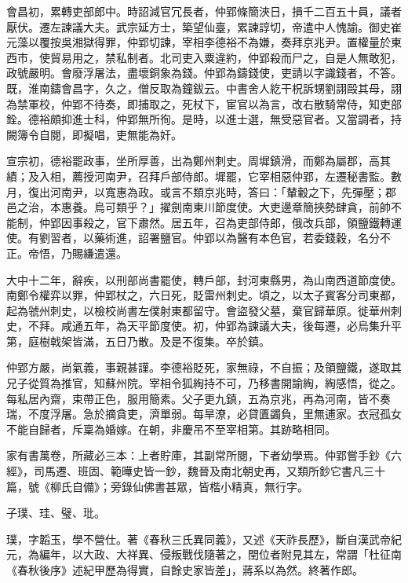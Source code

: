 \begin{pinyinscope}
 會昌初，累轉吏部郎中。時詔減官冗長者，仲郢條簡浹日，損千二百五十員，議者厭伏。遷左諫議大夫。武宗延方士，築望仙臺，累諫諄切，帝遣中人愧諭。御史崔元藻以覆按吳湘獄得罪，仲郢切諫，宰相李德裕不為嫌，奏拜京兆尹。置權量於東西市，使貿易用之，禁私制者。北司吏入粟違約，仲郢殺而尸之，自是人無敢犯，政號嚴明。會廢浮屠法，盡壞銅象為錢。仲郢為鑄錢使，吏請以字識錢者，不答。既，淮南鑄會昌字，久之，僧反取為鐘鈸云。中書舍人紇干柷訴甥劉詡毆其母，詡為禁軍校，仲郢不待奏，即捕取之，死杖下，宦官以為言，改右散騎常侍，知吏部銓。德裕頗抑進士科，仲郢無所徇。是時，以進士選，無受惡官者。又當調者，持闕簿令自閱，即擬唱，吏無能為奸。



 宣宗初，德裕罷政事，坐所厚善，出為鄭州刺史。周墀鎮滑，而鄭為屬郡，高其績；及入相，薦授河南尹，召拜戶部侍郎。墀罷，它宰相惡仲郢，左遷秘書監。數月，復出河南尹，以寬惠為政。或言不類京兆時，答曰：「輦轂之下，先彈壓；郡邑之治，本惠養。烏可類乎？」擢劍南東川節度使。大吏邊章簡挾勢肆貪，前帥不能制，仲郢因事殺之，官下肅然。居五年，召為吏部侍郎，俄改兵部，領鹽鐵轉運使。有劉習者，以藥術進，詔署鹽官。仲郢以為醫有本色官，若委錢穀，名分不正。帝悟，乃賜縑遣還。



 大中十二年，辭疾，以刑部尚書罷使，轉戶部，封河東縣男，為山南西道節度使。南鄭令權弈以罪，仲郢杖之，六日死，貶雷州刺史。頃之，以太子賓客分司東都，起為虢州刺史，以檢校尚書左僕射東都留守。會盜發父墓，棄官歸華原。徙華州刺史，不拜。咸通五年，為天平節度使。初，仲郢為諫議大夫，後每遷，必烏集升平第，庭樹戟架皆滿，五日乃散。及是不復集。卒於鎮。



 仲郢方嚴，尚氣義，事親甚謹。李德裕貶死，家無祿，不自振；及領鹽鐵，遂取其兄子從質為推官，知蘇州院。宰相令狐綯持不可，乃移書開諭綯，綯感悟，從之。每私居內齋，束帶正色，服用簡素。父子更九鎮，五為京兆，再為河南，皆不奏瑞，不度浮屠。急於摘貪吏，濟單弱。每旱潦，必貸匱蠲負，里無逋家。衣冠孤女不能自歸者，斥稟為婚嫁。在朝，非慶吊不至宰相第。其跡略相同。



 家有書萬卷，所藏必三本：上者貯庫，其副常所閱，下者幼學焉。仲郢嘗手鈔《六經》，司馬遷、班固、範曄史皆一鈔，魏晉及南北朝史再，又類所鈔它書凡三十篇，號《柳氏自備》；旁錄仙佛書甚眾，皆楷小精真，無行字。



 子璞、珪、璧、玭。



 璞，字韜玉，學不營仕。著《春秋三氏異同義》，又述《天祚長歷》，斷自漢武帝紀元，為編年，以大政、大祥異、侵叛戰伐隨著之，閏位者附見其左，常謂「杜征南《春秋後序》述紀甲歷為得實，自餘史家皆差」，蔣系以為然。終著作郎。




\end{pinyinscope}
